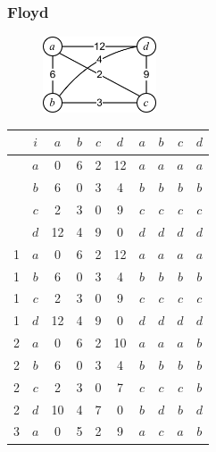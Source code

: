 \newpage

\subsubsection*{Floyd}

\begin{figure}[h]
\centering
\includegraphics[width=0.3\textwidth]{graphics/floyd.png}
\end{figure}

\begin{table}[h]
\centering
\begin{tabular}{c|c|cccc|cccc}
& $i$ & $a$ & $b$ & $c$ & $d$ & $a$ & $b$ & $c$ & $d$\\
\hline
& $a$ & 0  & 6 & 2 & 12 & $a$ & $a$ & $a$ & $a$\\ 
& $b$ & 6  & 0 & 3 & 4  & $b$ & $b$ & $b$ & $b$\\
& $c$ & 2  & 3 & 0 & 9  & $c$ & $c$ & $c$ & $c$\\
& $d$ & 12 & 4 & 9 & 0  & $d$ & $d$ & $d$ & $d$\\
\hline
1 & $a$ & {\color{red}0}  & {\color{red}6} & {\color{red}2} & {\color{red}12} & {\color{red}$a$} & {\color{red}$a$} & {\color{red}$a$} & {\color{red}$a$}\\ 
1 & $b$ & {\color{red}6}  & 0 & 3 & 4  & $b$ & $b$ & $b$ & $b$\\
1 & $c$ & {\color{red}2}  & 3 & 0 & 9  & $c$ & $c$ & $c$ & $c$\\
1 & $d$ & {\color{red}12} & 4 & 9 & 0  & $d$ & $d$ & $d$ & $d$\\
\hline
2 & $a$ & 0  & {\color{red}6} & 2 & {\color{blue}10} & $a$ & $a$ & $a$ & {\color{blue}$b$}\\ 
2 & $b$ & {\color{red}6}  & {\color{red}0} & {\color{red}3} & {\color{red}4} & {\color{red}$b$} & {\color{red}$b$} & {\color{red}$b$} & {\color{red}$b$}\\
2 & $c$ & 2  & {\color{red}3} & 0 & {\color{blue}7}  & $c$ & $c$ & $c$ & {\color{blue}$b$}\\
2 & $d$ & {\color{blue}10} & {\color{red}4} & {\color{blue}7} & 0  & {\color{blue}$b$} & $d$ & {\color{blue}$b$} & $d$\\
\hline
3 & $a$ & 0  & {\color{blue}5} & {\color{red}2} & {\color{blue}9} & $a$ & {\color{blue}$c$} & $a$ & $b$\\

\end{tabular}
\end{table}
